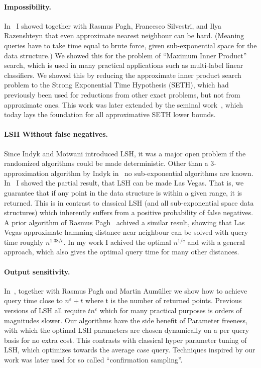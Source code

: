 \documentclass[10pt]{article}
\begin{document}
\paragraph{Impossibility.} In~\cite{ahle2016complexity} I showed together with Rasmus Pagh, Francesco Silvestri, and Ilya Razenshteyn that even approximate nearest neighbour can be hard. (Meaning queries have to take time equal to brute force, given sub-exponential space for the data structure.) We showed this for the problem of “Maximum Inner Product” search, which is used in many practical applications such as multi-label linear classifiers.
We showed this by reducing the approximate inner product search problem to the Strong Exponential Time Hypothesis (SETH), which had previously been used for reductions from other exact problems, but not from approximate ones.
This work was later extended by the seminal work~\cite{DBLP:journals/corr/AbboudR17}, which today lays the foundation for all approximative SETH lower bounds.

\paragraph{LSH Without false negatives.} Since Indyk and Motwani introduced LSH, it was a major open problem if the randomized algorithms could be made deterministic. Other than a 3-approximation algorithm by Indyk in~\cite{indyk2007uncertainty} no sub-exponential algorithms are known. In~\cite{ahle2017optimal} I showed the partial result, that LSH can be made Las Vegas. That is, we guarantee that if any point in the data structure is within a given range, it is returned.
This is in contrast to classical LSH (and all sub-exponential space data structures) which inherently suffers from a positive probability of false negatives.
A prior algorithm of Rasmus Pagh~\cite{pagh2016locality} achived a similar result, showing that Las Vegas approximate hamming distance near neighbour can be solved with query time roughly $n^{1.38/c}$.
In my work I achived the optimal $n^{1/c}$ and with a general approach, which also gives the optimal query time for many other distances.

\paragraph{Output sensitivity.} In~\cite{ahle2017parameter}, together with Rasmus Pagh and Martin Aumüller we show how to achieve query time close to $n^\varepsilon + t$ where t is the number of returned points. Previous versions of LSH all require $t n^\varepsilon$ which for many practical purposes is orders of magnitudes slower. Our algorithms have the side benefit of Parameter freeness, with which the optimal LSH parameters are chosen dynamically on a per query basis for no extra cost. This contrasts with classical hyper parameter tuning of LSH, which optimizes towards the average case query. Techniques inspired by our work was later used for so called “confirmation sampling”.
\end{document}
